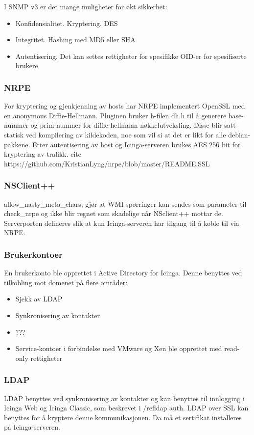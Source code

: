 I SNMP v3 er det mange muligheter for økt sikkerhet:
\begin{itemize}
	\item Konfidensialitet. Kryptering. DES
	\item Integritet. Hashing med MD5 eller SHA
	\item Autentisering. Det kan settes rettigheter for spesifikke OID-er for spesifiserte brukere
\end{itemize}

\subsubsection{NRPE}
For kryptering og gjenkjenning av hosts har NRPE implementert OpenSSL med en anonymous Diffie-Hellmann. Pluginen bruker h-filen dh.h til å generere base-nummer og prim-nummer for diffie-hellmann nøkkelutveksling. Disse blir satt statisk ved kompilering av kildekoden, noe som vil si at det er likt for alle debian-pakkene. Etter autentisering av host og Icinga-serveren brukes AES 256 bit for kryptering av trafikk. cite https://github.com/KristianLyng/nrpe/blob/master/README.SSL
\subsubsection{NSClient++}
allow\_nasty\_meta\_chars, gjør at WMI-spørringer kan sendes som parameter til check\_nrpe og ikke blir regnet som skadelige når NSclient++ mottar de. Serverporten defineres slik at kun Icinga-serveren har tilgang til å koble til via NRPE.
\subsubsection{Brukerkontoer}
En brukerkonto ble opprettet i Active Directory for Icinga. Denne benyttes ved tilkobling mot domenet på flere områder:
\begin{itemize}
	\item Sjekk av LDAP
	\item Synkronisering av kontakter
	\item ???
	\item Service-kontoer i forbindelse med VMware og Xen ble opprettet med read-only rettigheter
\end{itemize}
\subsubsection{LDAP}
LDAP benyttes ved synkronisering av kontakter og kan benyttes til innlogging i Icinga Web og Icinga Classic, som beskrevet i /ref{ldap auth}. LDAP over SSL kan benyttes for å kryptere denne kommunikasjonen. Da må et sertifikat installeres på Icinga-serveren.
